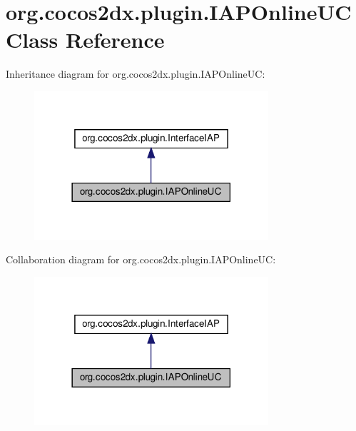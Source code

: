 \hypertarget{classorg_1_1cocos2dx_1_1plugin_1_1IAPOnlineUC}{}\section{org.\+cocos2dx.\+plugin.\+I\+A\+P\+Online\+UC Class Reference}
\label{classorg_1_1cocos2dx_1_1plugin_1_1IAPOnlineUC}


Inheritance diagram for org.\+cocos2dx.\+plugin.\+I\+A\+P\+Online\+UC\+:
\nopagebreak
\begin{figure}[H]
\begin{center}
\leavevmode
\includegraphics[width=246pt]{classorg_1_1cocos2dx_1_1plugin_1_1IAPOnlineUC__inherit__graph}
\end{center}
\end{figure}


Collaboration diagram for org.\+cocos2dx.\+plugin.\+I\+A\+P\+Online\+UC\+:
\nopagebreak
\begin{figure}[H]
\begin{center}
\leavevmode
\includegraphics[width=246pt]{classorg_1_1cocos2dx_1_1plugin_1_1IAPOnlineUC__coll__graph}
\end{center}
\end{figure}
